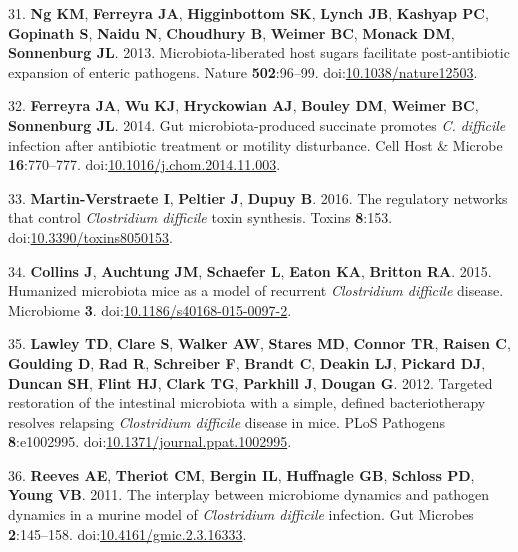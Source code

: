 \documentclass[
  12pt,
]{article}
\newenvironment{cslreferences}%
  {}%
  {\par}
\begin{document}
\begin{cslreferences}
\leavevmode\hypertarget{ref-Ng2013}{}%
31. \textbf{Ng KM}, \textbf{Ferreyra JA}, \textbf{Higginbottom SK},
\textbf{Lynch JB}, \textbf{Kashyap PC}, \textbf{Gopinath S},
\textbf{Naidu N}, \textbf{Choudhury B}, \textbf{Weimer BC},
\textbf{Monack DM}, \textbf{Sonnenburg JL}. 2013. Microbiota-liberated
host sugars facilitate post-antibiotic expansion of enteric pathogens.
Nature \textbf{502}:96--99.
doi:\href{https://doi.org/10.1038/nature12503}{10.1038/nature12503}.

\leavevmode\hypertarget{ref-Ferreyra2014}{}%
32. \textbf{Ferreyra JA}, \textbf{Wu KJ}, \textbf{Hryckowian AJ},
\textbf{Bouley DM}, \textbf{Weimer BC}, \textbf{Sonnenburg JL}. 2014.
Gut microbiota-produced succinate promotes \emph{C. difficile} infection
after antibiotic treatment or motility disturbance. Cell Host \& Microbe
\textbf{16}:770--777.
doi:\href{https://doi.org/10.1016/j.chom.2014.11.003}{10.1016/j.chom.2014.11.003}.

\leavevmode\hypertarget{ref-MartinVerstraete2016}{}%
33. \textbf{Martin-Verstraete I}, \textbf{Peltier J}, \textbf{Dupuy B}.
2016. The regulatory networks that control \emph{Clostridium difficile}
toxin synthesis. Toxins \textbf{8}:153.
doi:\href{https://doi.org/10.3390/toxins8050153}{10.3390/toxins8050153}.

\leavevmode\hypertarget{ref-Collins2015}{}%
34. \textbf{Collins J}, \textbf{Auchtung JM}, \textbf{Schaefer L},
\textbf{Eaton KA}, \textbf{Britton RA}. 2015. Humanized microbiota mice
as a model of recurrent \emph{Clostridium difficile} disease. Microbiome
\textbf{3}.
doi:\href{https://doi.org/10.1186/s40168-015-0097-2}{10.1186/s40168-015-0097-2}.

\leavevmode\hypertarget{ref-Lawley2012}{}%
35. \textbf{Lawley TD}, \textbf{Clare S}, \textbf{Walker AW},
\textbf{Stares MD}, \textbf{Connor TR}, \textbf{Raisen C},
\textbf{Goulding D}, \textbf{Rad R}, \textbf{Schreiber F},
\textbf{Brandt C}, \textbf{Deakin LJ}, \textbf{Pickard DJ},
\textbf{Duncan SH}, \textbf{Flint HJ}, \textbf{Clark TG},
\textbf{Parkhill J}, \textbf{Dougan G}. 2012. Targeted restoration of
the intestinal microbiota with a simple, defined bacteriotherapy
resolves relapsing \emph{Clostridium difficile} disease in mice. PLoS
Pathogens \textbf{8}:e1002995.
doi:\href{https://doi.org/10.1371/journal.ppat.1002995}{10.1371/journal.ppat.1002995}.

\leavevmode\hypertarget{ref-Reeves2011}{}%
36. \textbf{Reeves AE}, \textbf{Theriot CM}, \textbf{Bergin IL},
\textbf{Huffnagle GB}, \textbf{Schloss PD}, \textbf{Young VB}. 2011. The
interplay between microbiome dynamics and pathogen dynamics in a murine
model of \emph{Clostridium difficile} infection. Gut Microbes
\textbf{2}:145--158.
doi:\href{https://doi.org/10.4161/gmic.2.3.16333}{10.4161/gmic.2.3.16333}.


\end{cslreferences}
\end{document}
